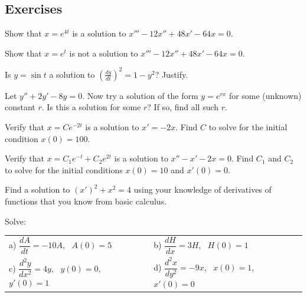 \documentclass[12pt]{book}
\begin{document}
\subsection{Exercises}

\begin{exercise}
Show that $x = e^{4t}$ is a solution to $x'''-12 x'' + 48 x' - 64 x = 0$.
\end{exercise}

\begin{exercise}
Show that $x = e^{t}$ is not a solution to $x'''-12 x'' + 48 x' - 64 x = 0$.
\end{exercise}

\begin{exercise}
Is $y = \sin t$ a solution to ${\left( \frac{dy}{dt} \right)}^2 = 1 - y^2$?
Justify.
\end{exercise}

\begin{exercise}
Let $y'' + 2y' - 8y = 0$.  Now try a solution of the form $y = e^{rx}$ for
some (unknown) constant $r$.  Is this a solution
for some $r$?  If so, find all such $r$.
\end{exercise}

\begin{exercise}
Verify that $x = C e^{-2t}$ is a solution to $x' = -2x$.
Find $C$ to solve for the initial condition $x(0) = 100$.
\end{exercise}

\begin{exercise}
Verify that $x = C_1 e^{-t} + C_2 e^{2t}$ is a solution to $x'' - x' -2 x =
0$.  Find $C_1$ and $C_2$ to solve for the initial conditions $x(0) = 10$
and $x'(0) = 0$.
\end{exercise}

\begin{exercise}
Find a solution to
${(x')}^2 + x^2 = 4$
using your knowledge of derivatives of functions that you
know from basic calculus.
\end{exercise}

\begin{exercise}
Solve:
\medskip

\noindent
\begin{tabular}{llll}
a) $\dfrac{dA}{dt} = -10 A$,~ $A(0)=5$ & &
b) $\dfrac{dH}{dx} = 3 H$,~ $H(0)=1$ \\[12pt]
c) $\dfrac{d^2y}{dx^2} = 4 y$,~ $y(0)=0$,~ $y'(0)=1$ &&
d) $\dfrac{d^2x}{dy^2} = -9 x$,~ $x(0)=1$,~ $x'(0)=0$
\end{tabular}
\end{exercise}
\end{document}
